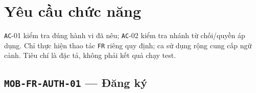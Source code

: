\clearpage
\section{Yêu cầu chức năng}\label{sec:srs-9}
\texttt{AC}-01 kiểm tra đúng hành vi đã nêu; \texttt{AC}-02 kiểm tra nhánh từ chối/\allowbreak{}quyền áp dụng. Chỉ thực hiện thao tác \texttt{FR} riêng quy định; ca sử dụng rộng cung cấp ngữ cảnh. Tiêu chí là đặc tả, không phải kết quả chạy test.

\subsection{\texttt{MOB-\allowbreak{}FR-\allowbreak{}AUTH-\allowbreak{}01} — Đăng ký}
\begingroup
\fontsize{9.5}{12}\selectfont
\setlength{\SRSWidth}{\dimexpr\linewidth-2\tabcolsep\relax}
